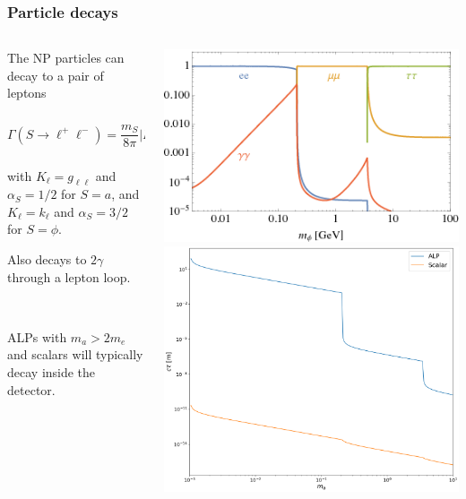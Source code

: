 \documentclass[mathserif, 10pt, aspectratio=169]{beamer}
\begin{document}
\begin{frame}\frametitle{Particle decays}
    
    \begin{columns}

        \begin{column}{0.6\textwidth}
            The NP particles can decay to a pair of leptons

            $$\Gamma(S \to \ell^+\ell^-) = \frac{m_S}{8\pi} |K_\ell|^2 \left(1-\frac{4 m_\ell^2}{m_S^2}\right)^{\alpha_S}\,,$$

            {\small with $K_\ell = g_{\ell\ell}$ and $\alpha_S = 1/2$ for $S=a$, and $K_\ell = k_\ell$ and $\alpha_S = 3/2$ for $S=\phi$.}

            Also decays to $2\gamma$ through a lepton loop.

            ~

            ALPs with $m_a > 2 m_e$ and scalars will typically decay inside the detector.
        \end{column}
        \begin{column}{0.38\textwidth}
            \includegraphics[width=\columnwidth]{figures/BR_S.png} \\
            \includegraphics[width=\columnwidth]{figures/properlength.png}
        \end{column}
    \end{columns}
\end{frame}
\end{document}
